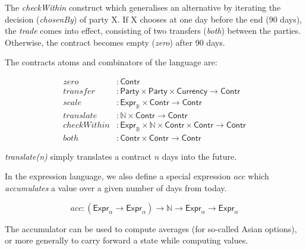 \documentclass[a4paper,debug,twocolumn]{easychair}
\newcommand{\comm}[3][red]{{\small \color{#1}{$\spadesuit$#2: #3}}}
\newcommand{\jbcomment}[1]{\comm[orange]{jb}{#1}}
\newcommand\type[1]{\mathsf{#1}}
\newcommand\reals{{\mathbb R}}
\newcommand\nats{{\mathbb N}}
\newcommand\bools{{\mathbb B}}
\theoremstyle{plain}
\begin{document}
The \emph{checkWithin} construct which generalises an alternative by
iterating the decision (\emph{chosenBy}) of party X.
If X chooses at one day before the end (90 days), the \emph{trade} comes
into effect, consisting of two transfers (\emph{both}) between the parties.
Otherwise, the contract becomes empty (\emph{zero}) after 90 days.

The contracts atoms and combinators of the language are:

\vspace*{-3ex}
{\small

\begin{align*}
\mathit{zero} &: \type{Contr}\\[-0.6ex]
\mathit{transfer} &: \type{Party} \times \type{Party} \times \type{Currency}\to \type{Contr}\\[-0.6ex]
\mathit{scale}&: \type{Expr}_\reals \times \type{Contr} \to \type{Contr}\\[-0.6ex]
\mathit{translate}&: \nats \times \type{Contr} \to \type{Contr}\\[-0.6ex]
\mathit{checkWithin}&:  \type{Expr}_\bools \times \nats \times \type{Contr} \times \type{Contr} %
\to \type{Contr}\\[-0.6ex]
\mathit{both}&: \type{Contr} \times \type{Contr} \to \type{Contr}
\end{align*}
\vspace*{-3ex}
}

\emph{translate(n)} simply translates a contract $n$ days into the future.


In the expression language, we also define a special
expression $\mathit{acc}$ which \emph{accumulates} a value over a
given number of days from today.

\vspace*{-2ex}
{\small
\[
\mathit{acc} : (\type{Expr}_\alpha \to \type{Expr}_\alpha) \to \nats \to \type{Expr}_\alpha \to \type{Expr}_\alpha
\]
}
\vspace*{-3ex}

The accumulator can be used to compute averages (for so-called Asian options),
or more generally to carry forward a state while computing values.
\end{document}
